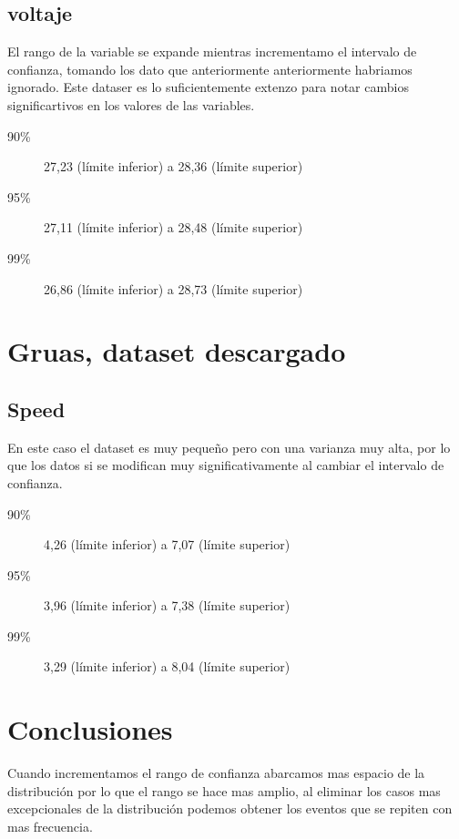 \documentclass[11pt]{article}
\begin{document}
\subsection{voltaje}
\label{sec:org8d53fd6}
El rango de la variable se expande mientras incrementamo el intervalo de confianza, tomando los dato que anteriormente anteriormente habriamos ignorado. Este dataser es lo suficientemente extenzo para notar cambios significartivos en los valores de las variables.

\begin{description}
\item[{90\%}] 27,23 (límite inferior) a 28,36 (límite superior)
\item[{95\%}] 27,11 (límite inferior) a 28,48 (límite superior)
\item[{99\%}] 26,86 (límite inferior) a 28,73 (límite superior)
\end{description}

\section{Gruas, dataset descargado}
\label{sec:orgba73ae7}
\subsection{Speed}
\label{sec:org2ac57de}
En este caso el dataset es muy pequeño pero con una varianza muy alta, por lo que los datos si se modifican muy significativamente al cambiar el intervalo de confianza.  

\begin{description}
\item[{90\%}] 4,26 (límite inferior) a 7,07 (límite superior)
\item[{95\%}] 3,96 (límite inferior) a 7,38 (límite superior)
\item[{99\%}] 3,29 (límite inferior) a 8,04 (límite superior)
\end{description}

\section{Conclusiones}
\label{sec:orged56640}
Cuando incrementamos el rango de confianza abarcamos mas espacio de la distribución por lo que el rango se hace mas amplio, al eliminar los casos mas excepcionales de la distribución podemos obtener los eventos que se repiten con mas frecuencia.
\end{document}

